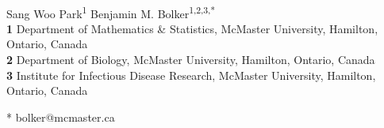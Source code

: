 \documentclass[10pt,letterpaper]{article}
\date{}
\begin{document}
\vspace*{0.2in}

\begin{flushleft}
{\Large
\textbf{} %
}
\newline
\\
Sang Woo Park\textsuperscript{1}
Benjamin M. Bolker\textsuperscript{1,2,3,*}
\\
\bigskip
\textbf{1} Department of Mathematics \& Statistics,  McMaster University, Hamilton, Ontario, Canada
\\
\textbf{2} Department of Biology,  McMaster University, Hamilton, Ontario, Canada
\\
\textbf{3} Institute for Infectious Disease Research,  McMaster University, Hamilton, Ontario, Canada
\\
\bigskip

% 
%





* bolker@mcmaster.ca

\end{flushleft}
\end{document}

